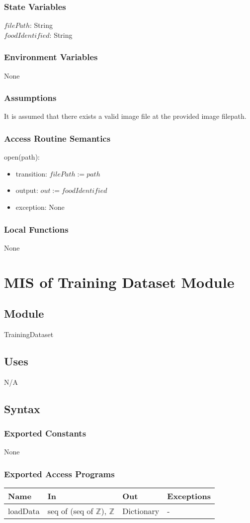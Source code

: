 \documentclass[12pt, titlepage]{article}
\begin{document}
\subsubsection{State Variables}
$filePath$: String\\
$foodIdentified$: String
\subsubsection{Environment Variables}
None
\subsubsection{Assumptions}
It is assumed that there exists a valid image file at the provided image filepath.
\subsubsection{Access Routine Semantics}
\noindent open(path):
\begin{itemize}
	\item transition: $filePath := path$
	\item output: $out := foodIdentified$
	\item exception: None
\end{itemize}
\subsubsection{Local Functions}
None

\newpage

\section{MIS of Training Dataset Module} \label{TrainingDataset}
\subsection{Module}
TrainingDataset
\subsection{Uses}
N/A
\subsection{Syntax}
\subsubsection{Exported Constants}
None
\subsubsection{Exported Access Programs}
\begin{center}
	\begin{tabular}{p{2cm} p{5cm} p{5cm} p{2cm}}
		\hline
		\textbf{Name} & \textbf{In} & \textbf{Out} & \textbf{Exceptions} \\
		\hline
		loadData & seq of (seq of $\mathbb{Z}$), $\mathbb{Z}$ & Dictionary & - \\
		\hline
	\end{tabular}
\end{center}
\end{document}
